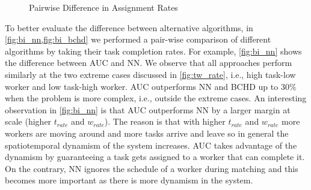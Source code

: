 \begin{figure}[h]
	\centering
    \vspace{-0.15in}
	\caption{Pairwise Difference in Assignment Rates}
\end{figure}

To better evaluate the difference between alternative algorithms, in \cref{fig:bi_nn,fig:bi_bchd} we performed a pair-wise comparison of different algorithms by taking their task completion rates. For example, \cref{fig:bi_nn} shows the difference between AUC and NN. We observe that all approaches perform similarly at the two extreme cases discussed in \cref{fig:tw_rate}, i.e., high task-low worker and low task-high worker. AUC outperforms NN and BCHD up to 30\% when the problem is more complex, i.e., outside the extreme cases. An interesting observation in \cref{fig:bi_nn} is that AUC outperforms NN by a larger margin at scale (higher $t_{rate}$ and $w_{rate}$). The reason is that with higher $t_{rate}$ and $w_{rate}$ more workers are moving around and more tasks arrive and leave so in general the spatiotemporal dynamism of the system increases. AUC takes advantage of the dynamism by guaranteeing a task gets assigned to a worker that can complete it. On the contrary, NN ignores the schedule of a worker during matching and this becomes more important as there is more dynamism in the system.

